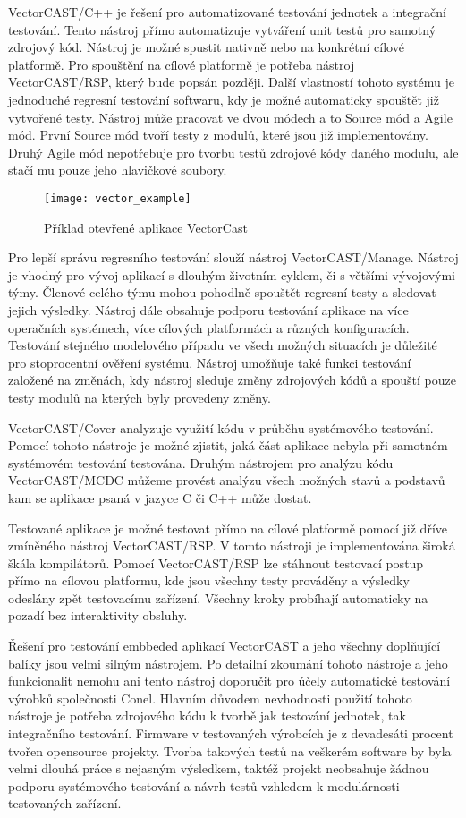 VectorCAST/C++ je řešení pro automatizované testování jednotek a integrační testování. Tento nástroj přímo automatizuje vytváření unit testů pro samotný zdrojový kód. Nástroj je možné spustit nativně nebo na konkrétní cílové platformě. Pro spouštění na cílové platformě je potřeba nástroj VectorCAST/RSP, který bude popsán později. Další vlastností tohoto systému je jednoduché regresní testování softwaru, kdy je možné automaticky spouštět již vytvořené testy. Nástroj může pracovat ve dvou módech a to Source mód a Agile mód. První Source mód tvoří testy z modulů, které jsou již implementovány. Druhý Agile mód nepotřebuje pro tvorbu testů zdrojové kódy daného modulu, ale stačí mu pouze jeho hlavičkové soubory.

\begin{figure}[h]
  \centering
  \texttt{[image: vector\_example]}
  \caption{Příklad otevřené aplikace VectorCast}
  \label{fig:vector_example}
\end{figure}

Pro lepší správu regresního testování slouží nástroj VectorCAST/Manage. Nástroj je vhodný pro vývoj aplikací s dlouhým životním cyklem, či s většími vývojovými týmy. Členové celého týmu mohou pohodlně spouštět regresní testy a sledovat jejich výsledky. Nástroj dále obsahuje podporu testování aplikace na více operačních systémech, více cílových platformách a různých konfiguracích. Testování stejného modelového případu ve všech možných situacích je důležité pro stoprocentní ověření systému. Nástroj umožňuje také funkci testování založené na změnách, kdy nástroj sleduje změny zdrojových kódů a spouští pouze testy modulů na kterých byly provedeny změny.

VectorCAST/Cover analyzuje využití kódu v průběhu systémového testování. Pomocí tohoto nástroje je možné zjistit, jaká část aplikace nebyla při samotném systémovém testování testována. Druhým nástrojem pro analýzu kódu VectorCAST/MCDC můžeme provést analýzu všech možných stavů a podstavů kam se aplikace psaná v jazyce C či C++ může dostat.

Testované aplikace je možné testovat přímo na cílové platformě pomocí již dříve zmíněného nástroj VectorCAST/RSP. V tomto nástroji je implementována široká škála kompilátorů. Pomocí VectorCAST/RSP lze stáhnout testovací postup přímo na cílovou platformu, kde jsou všechny testy prováděny a výsledky odeslány zpět testovacímu zařízení. Všechny kroky probíhají automaticky na pozadí bez interaktivity obsluhy.

Řešení pro testování embbeded aplikací VectorCAST a jeho všechny doplňující balíky jsou velmi silným nástrojem. Po detailní zkoumání tohoto nástroje a jeho funkcionalit nemohu ani tento nástroj doporučit pro účely automatické testování výrobků společnosti Conel. Hlavním důvodem nevhodnosti použití tohoto nástroje je potřeba zdrojového kódu k tvorbě jak testování jednotek, tak integračního testování. Firmware v testovaných výrobcích je z devadesáti procent tvořen opensource projekty. Tvorba takových testů na veškerém software by byla velmi dlouhá práce s nejasným výsledkem, taktéž projekt neobsahuje žádnou podporu systémového testování a návrh testů vzhledem k modulárnosti testovaných zařízení.

